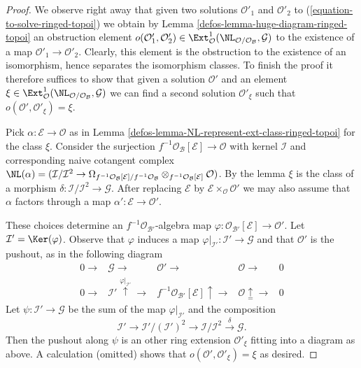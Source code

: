 \begin{proof}

We observe right away that given two solutions $\mathcal{O}'_1$ and
$\mathcal{O}'_2$ to (\ref{equation-to-solve-ringed-topoi}) we obtain by
Lemma \ref{defos-lemma-huge-diagram-ringed-topoi} an obstruction element
$o(\mathcal{O}'_1, \mathcal{O}'_2) \in \Ext^1_\mathcal{O}(
\NL_{\mathcal{O}/\mathcal{O}_\mathcal{B}}, \mathcal{G})$
to the existence of a map $\mathcal{O}'_1 \to \mathcal{O}'_2$.
Clearly, this element
is the obstruction to the existence of an isomorphism, hence separates
the isomorphism classes. To finish the proof it therefore suffices to
show that given a solution $\mathcal{O}'$ and an element
$\xi \in \Ext^1_\mathcal{O}(
\NL_{\mathcal{O}/\mathcal{O}_\mathcal{B}}, \mathcal{G})$
we can find a second solution $\mathcal{O}'_\xi$ such that
$o(\mathcal{O}', \mathcal{O}'_\xi) = \xi$.

\medskip\noindent
Pick $\alpha : \mathcal{E} \to \mathcal{O}$ as in
Lemma \ref{defos-lemma-NL-represent-ext-class-ringed-topoi}
for the class $\xi$. Consider the surjection
$f^{-1}\mathcal{O}_\mathcal{B}[\mathcal{E}] \to \mathcal{O}$
with kernel $\mathcal{I}$ and corresponding naive cotangent complex
$\NL(\alpha) = (\mathcal{I}/\mathcal{I}^2 \to
\Omega_{f^{-1}\mathcal{O}_\mathcal{B}[\mathcal{E}]/
f^{-1}\mathcal{O}_\mathcal{B}}
\otimes_{f^{-1}\mathcal{O}_\mathcal{B}[\mathcal{E}]} \mathcal{O})$.
By the lemma $\xi$ is the class of a morphism
$\delta : \mathcal{I}/\mathcal{I}^2 \to \mathcal{G}$.
After replacing $\mathcal{E}$ by
$\mathcal{E} \times_\mathcal{O} \mathcal{O}'$ we may also assume
that $\alpha$ factors through a map
$\alpha' : \mathcal{E} \to \mathcal{O}'$.

\medskip\noindent
These choices determine an $f^{-1}\mathcal{O}_{\mathcal{B}'}$-algebra map
$\varphi : \mathcal{O}_{\mathcal{B}'}[\mathcal{E}] \to \mathcal{O}'$.
Let $\mathcal{I}' = \Ker(\varphi)$.
Observe that $\varphi$ induces a map
$\varphi|_{\mathcal{I}'} : \mathcal{I}' \to \mathcal{G}$
and that $\mathcal{O}'$ is the pushout, as in the following
diagram
$$
\begin{array}{ccccc}0 \longrightarrow & \mathcal{G} \longrightarrow & \mathcal{O}' \longrightarrow & \mathcal{O} \longrightarrow & 0 \\ 0 \longrightarrow & \mathcal{I}' \overset{\varphi|_{\mathcal{I}'}}{\uparrow}\longrightarrow & f^{-1}\mathcal{O}_{\mathcal{B}'}[\mathcal{E}] \uparrow\longrightarrow & \mathcal{O} \underset{=}{\uparrow}\longrightarrow & 0\end{array}
$$
Let $\psi : \mathcal{I}' \to \mathcal{G}$ be the sum of the map
$\varphi|_{\mathcal{I}'}$ and the composition
$$
\mathcal{I}' \to \mathcal{I}'/(\mathcal{I}')^2 \to
\mathcal{I}/\mathcal{I}^2 \xrightarrow{\delta} \mathcal{G}.
$$
Then the pushout along $\psi$ is an other ring extension
$\mathcal{O}'_\xi$ fitting into a diagram as above.
A calculation (omitted) shows that $o(\mathcal{O}', \mathcal{O}'_\xi) = \xi$
as desired.
\end{proof}

